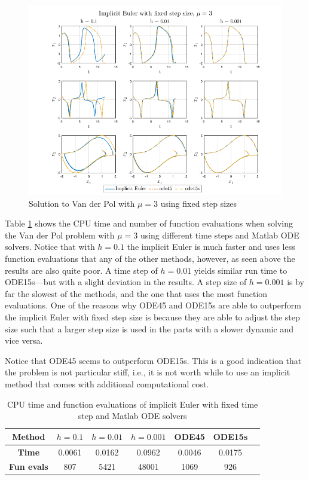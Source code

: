 \begin{figure}[H]
    \centering
    \includegraphics[width=\textwidth]{graphics/opg3/mu3_fixed.png}
    \caption{Solution to Van der Pol with $\mu = 3$ using fixed step sizes}
    \label{fig3:fixed_mu3}
\end{figure}

Table \ref{tab3:mu3_fixed} shows the CPU time and number of function evaluations when solving the Van der Pol problem with $\mu = 3$ using different time steps and Matlab ODE solvers. Notice that with $h=0.1$ the implicit Euler is much faster and uses less function evaluations that any of the other methods, however, as seen above the results are also quite poor. A time step of $h=0.01$ yields similar run time to ODE15s---but with a slight deviation in the results. A step size of $h=0.001$ is by far the slowest of the methods, and the one that uses the most function evaluations. One of the reasons why ODE45 and ODE15s are able to outperform the implicit Euler with fixed step size is because they are able to adjust the step size such that a larger step size is used in the parts with a slower dynamic and vice versa. 

Notice that ODE45 seems to outperform ODE15s. This is a good indication that the problem is not particular stiff, i.e., it is not worth while to use an implicit method that comes with additional computational cost. 

\begin{table}[H]
    \centering
    \caption{CPU time and function evaluations of implicit Euler with fixed time step and Matlab ODE solvers}
    \begin{tabular}{|c||c|c|c|c|c|c|} \hline
         \textbf{Method}    & $h=0.1$&   $h=0.01$ & $h=0.001$ & ODE45 & ODE15s     \\ \hline \hline 
         \textbf{Time}      & 0.0061 &   0.0162  &   0.0962 & 0.0046 & 0.0175   \\ \hline
         \textbf{Fun evals} & 807   &     5421   & 48001 & 1069 & 926  \\ \hline
    \end{tabular}
    \label{tab3:mu3_fixed}
\end{table}



